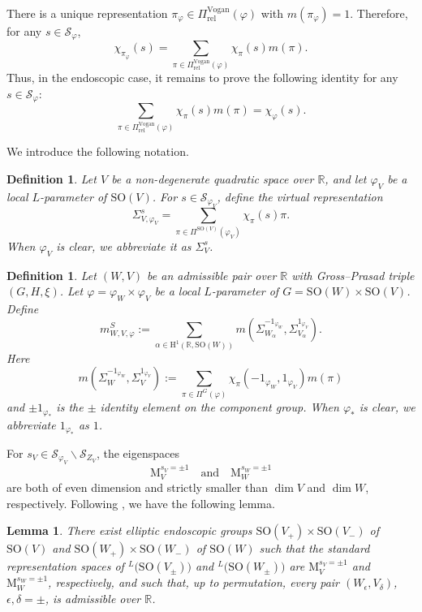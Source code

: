 \documentclass[12pt]{amsart}
\numberwithin{equation}{subsection}
\newcommand{\BR}{{\mathbb {R}}}
\newcommand{\CS}{{\mathcal {S}}}
\newcommand{\RH}{{\mathrm {H}}}
\newcommand{\RM}{{\mathrm {M}}}
\newcommand{\SO}{{\mathrm{SO}}}
\newcommand{\bs}{\backslash}
\def\alp{{\alpha}}
\def\Sig{{\Sigma}}
\def\vphi{\varphi}
\def\Vg{\mathrm{Vogan}}
\def\rel{\mathrm{rel}}
\def\SO{\mathrm{SO}}
\newtheorem{defin}[thm]{Definition}
\newtheorem{lem}[thm]{Lemma}
\begin{document}
There is a unique representation $\pi_\vphi\in \Pi_\rel^\Vg(\vphi)$ with $m(\pi_\vphi)=1$. Therefore, for any $s\in \CS_\vphi$,
\[
\chi_{\pi_\vphi}(s) = \sum_{\pi\in \Pi^\Vg_\rel(\vphi)}\chi_{\pi}(s) m(\pi).
\]
Thus, in the endoscopic case, it remains to prove the following identity for
any $s\in \CS_\vphi$:
\begin{equation}\label{eq:endoscopic:1}
\sum_{\pi\in \Pi^\Vg_\rel(\vphi)}\chi_{\pi}(s)
m(\pi) = \chi_\vphi(s).
\end{equation}

We introduce the following notation.

\begin{defin}\label{defin:virtualrep}
Let $V$ be a non-degenerate quadratic space over $\BR$, and let $\vphi_V$ be a
local $L$-parameter of $\SO(V)$. For $s\in \CS_{\vphi_V}$, define the virtual
representation
\[
\Sig^s_{V,\vphi_V} =
\sum_{\pi\in \Pi^{\SO(V)}(\vphi_V)}
\chi_\pi(s) \pi.
\]
When $\vphi_V$ is clear, we abbreviate it as $\Sig^s_{V}$.
\end{defin}

\begin{defin}\label{defin:stablemultiplicity}
Let $(W,V)$ be an admissible pair over $\BR$ with Gross--Prasad triple
$(G,H,\xi)$. Let $\vphi = \vphi_W\times \vphi_V$ be a local $L$-parameter of
$G=\SO(W)\times \SO(V)$. Define
\[
m^S_{W,V,\vphi} :=
\sum_{\alp\in \RH^1(\BR,\SO(W))}m(
\Sig^{-1_{\vphi_W}}_{W_\alp},
\Sig^{1_{\vphi_V}}_{V_\alp}
).
\]
Here
\[
m(\Sig^{-1_{\vphi_W}}_{W},\Sig^{1_{\vphi_V}}_{V}) :=
\sum_{
\pi\in \Pi^{G}(\vphi)}
\chi_\pi(-1_{\vphi_W},1_{\vphi_V})
 m(\pi)
\]
and $\pm 1_{\vphi_*}$ is the $\pm$ identity element on the component group.
When $\vphi_*$ is clear, we abbreviate $1_{\vphi_*}$ as $1$.
\end{defin}

For $s_V\in \CS_{\vphi_V}\bs \CS_{Z_V}$, the eigenspaces
\[
\RM_V^{s_V = \pm 1}
\quad \text{and}\quad 
\RM_W^{s_W = \pm 1}
\]
are both of even dimension and strictly smaller than $\dim V$ and $\dim W$,
respectively. Following \cite[\S 1.7~\&~\S 3.3]{MR3155345}, we have the
following lemma.

\begin{lem}
There exist elliptic endoscopic groups $\SO(V_+)\times \SO(V_-)$ of
$\SO(V)$ and $\SO(W_+)\times \SO(W_-)$ of $\SO(W)$ such that the standard
representation spaces of ${}^L\big(\SO(V_\pm)\big)$ and
${}^L\big(\SO(W_\pm)\big)$ are $\RM_V^{s_V=\pm1}$ and
$\RM_W^{s_W=\pm1}$, respectively, and such that, up to permutation, every
pair $(W_\epsilon,V_\delta)$, $\epsilon,\delta=\pm$, is admissible over
$\BR$.
\end{lem}
\end{document}
